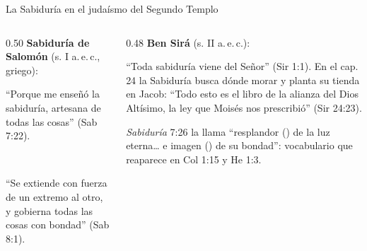 \begin{frame}{La Sabiduría en el judaísmo del Segundo Templo}
\begin{columns}[t,onlytextwidth]
\begin{column}{0.50\textwidth}\small
\textbf{Sabiduría de Salomón} (s. I a.\,e.\,c., griego):
\begin{center}\end{center}
``Porque me enseñó la sabiduría, artesana de todas las cosas'' (Sab 7:22).
\begin{center}\\ \end{center}
``Se extiende con fuerza de un extremo al otro, y gobierna todas las cosas con bondad'' (Sab 8:1).
\end{column}
\begin{column}{0.48\textwidth}\small
\textbf{Ben Sirá} (s. II a.\,e.\,c.):
\begin{center}\end{center}
``Toda sabiduría viene del Señor'' (Sir 1:1). En el cap. 24 la Sabiduría busca dónde morar y planta su tienda en Jacob: ``Todo esto es el libro de la alianza del Dios Altísimo, la ley que Moisés nos prescribió'' (Sir 24:23).\par\medskip
\scriptsize \emph{Sabiduría} 7:26 la llama ``resplandor () de la luz eterna\ldots{} e imagen () de su bondad'': vocabulario que reaparece en Col 1:15 y He 1:3.
\end{column}
\end{columns}
\end{frame}

